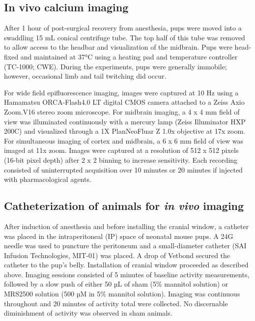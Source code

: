 \documentclass[9pt,lineno]{elife}
\begin{document}
\subsection{In vivo calcium imaging}
After 1 hour of post-surgical recovery from anesthesia, pups were moved into a swaddling 15 mL conical centrifuge tube. The top half of this tube was removed to allow access to the headbar and visualization of the midbrain. Pups were head-fixed and maintained at 37°C using a heating pad and temperature controller (TC-1000; CWE). During the experiments, pups were generally immobile; however, occasional limb and tail twitching did occur.

For wide field epifluorescence imaging, images were captured at 10 Hz using a Hamamatsu ORCA-Flash4.0 LT digital CMOS camera attached to a Zeiss Axio Zoom.V16 stereo zoom microscope. For midbrain imaging, a 4 x 4 mm field of view was illuminated continuously with a mercury lamp (Zeiss Illuminator HXP 200C) and visualized through a 1X PlanNeoFluar Z 1.0x objective at 17x zoom. For simultaneous imaging of cortex and midbrain, a 6 x 6 mm field of view was imaged at 11x zoom. Images were captured at a resolution of 512 x 512 pixels (16-bit pixel depth) after 2 x 2 binning to increase sensitivity. Each recording consisted of uninterrupted acquisition over 10 minutes or 20 minutes if injected with pharmacological agents.

\subsection{Catheterization of animals for \textit{in vivo} imaging}
After induction of anesthesia and before installing the cranial window, a catheter was placed in the intraperitoneal (IP) space of neonatal mouse pups. A 24G needle was used to puncture the peritoneum and a small-diameter catheter (SAI Infusion Technologies, MIT-01) was placed. A drop of Vetbond secured the catheter to the pup’s belly. Installation of cranial window proceeded as described above.
Imaging sessions consisted of 5 minutes of baseline activity measurements, followed by a slow push of either 50 µL of sham (5\% mannitol solution) or MRS2500 solution (500 µM in 5\% mannitol solution). Imaging was continuous throughout and 20 minutes of activity total were collected. No discernable diminishment of activity was observed in sham animals.
\end{document}
